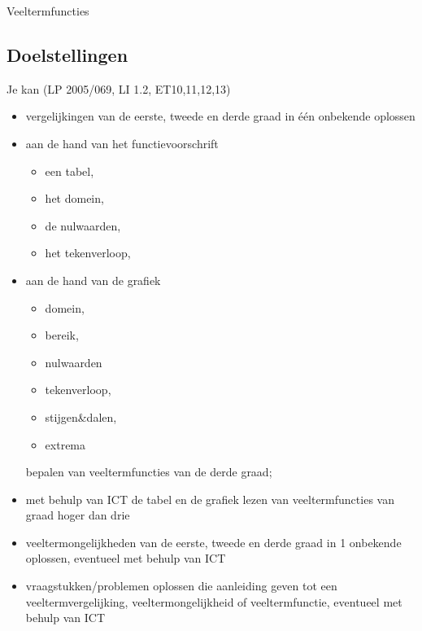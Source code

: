 \documentclass[12pt]{article}
\begin{document}
\pagestyle{fancy}
\lhead{}



\thispagestyle{empty}
\begin{center}
  \begin{mdframed}
    \centering
    \fontsize{35}{70}\selectfont Veeltermfuncties
  \end{mdframed}
  \vfill
  \vfill
\end{center}
\vspace*{-2cm}

\subsection*{Doelstellingen}
{\singlespacing
  Je kan \hfill  {\scriptsize(LP 2005/069, LI 1.2, ET10,11,12,13)}
  \begin{itemize}
  \item vergelijkingen van de eerste, tweede en derde graad in één onbekende oplossen
  \item aan de hand van het functievoorschrift
    \begin{itemize}
    \item een tabel,
    \item het domein,
    \item de nulwaarden,
    \item het tekenverloop,
    \end{itemize}
  \item aan de hand van de grafiek
    \begin{itemize}
    \item domein,
    \item bereik,
    \item nulwaarden
    \item tekenverloop,
    \item stijgen\&dalen,
    \item extrema
    \end{itemize}
    bepalen van veeltermfuncties van de derde graad;
  \item met behulp van ICT de tabel en de grafiek lezen van veeltermfuncties van graad hoger dan drie
  \item veeltermongelijkheden van de eerste, tweede en derde graad in 1 onbekende oplossen, eventueel met behulp van ICT
  \item vraagstukken/problemen oplossen die aanleiding geven tot een veeltermvergelijking, veeltermongelijkheid of veeltermfunctie, eventueel met behulp van ICT
  \end{itemize}

}
\thispagestyle{empty}
\mbox{}
\newpage
\clearpage
\thispagestyle{empty}
\tableofcontents
\newpage
\clearpage
{}
\end{document}
